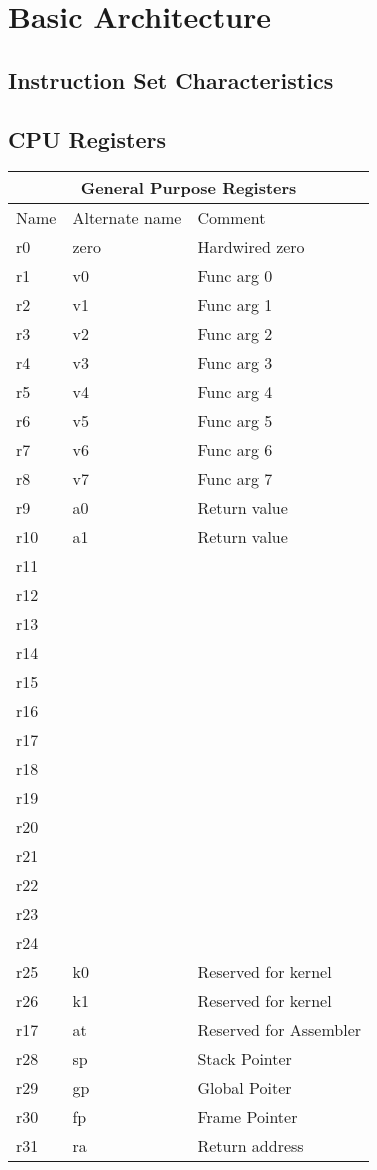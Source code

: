 \chapter{Basic Architecture}

\section{Instruction Set Characteristics}


\section{CPU Registers}

\begin{tabular}{ |p{3cm}|p{3cm}|p{4cm}|  }
    \hline
    \multicolumn{3}{|c|}{General Purpose Registers} \\
    \hline
    Name& Alternate name & Comment \\
    \hline
    r0  & zero & Hardwired zero\\
    r1  & v0   & Func arg 0 \\
    r2  & v1   & Func arg 1 \\
    r3  & v2   & Func arg 2 \\
    r4  & v3   & Func arg 3 \\
    r5  & v4   & Func arg 4 \\
    r6  & v5   & Func arg 5 \\
    r7  & v6   & Func arg 6 \\
    r8  & v7   & Func arg 7 \\
    r9  & a0   & Return value \\
    r10 & a1   & Return value \\
    r11 &      &  \\
    r12 &      &  \\
    r13 &      &  \\
    r14 &      &  \\
    r15 &      &  \\
    r16 &      &  \\
    r17 &      &  \\
    r18 &      &  \\
    r19 &      &  \\
    r20 &      &  \\
    r21 &      &  \\
    r22 &      &  \\
    r23 &      &  \\
    r24 &      &  \\
    r25 & k0   &  Reserved for kernel \\
    r26 & k1   &  Reserved for kernel \\
    r17 & at   &  Reserved for Assembler \\
    r28 & sp   &  Stack Pointer \\
    r29 & gp   &  Global Poiter \\
    r30 & fp   &  Frame Pointer \\
    r31 & ra   &  Return address \\

    \hline
   \end{tabular}